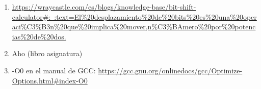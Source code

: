 \documentclass[11pt,a4paper,twoside]{article}
\theoremstyle{definition}
\begin{document}
	\begin{enumerate}
		\item \href{https://wraycastle.com/es/blogs/knowledge-base/bit-shift-calculator#:~:text=El%20desplazamiento%20de%20bits%20es%20una%20operaci%C3%B3n%20que%20implica%20mover,n%C3%BAmero%20por%20potencias%20de%20dos.}{https://wraycastle.com/es/blogs/knowledge-base/bit-shift-calculator\#:~:text=El\%20desplazamiento\%20de\%20bits\%20es\%20una\%20operaci\%C3\%B3n\%20que\%20implica\%20mover,n\%C3\%BAmero\%20por\%20potencias\%20de\%20dos.}
		
		\item Aho (libro asignatura)
		
		\item -O0 en el manual de GCC: \href{https://gcc.gnu.org/onlinedocs/gcc/Optimize-Options.html#index-O0}{https://gcc.gnu.org/onlinedocs/gcc/Optimize-Options.html\#index-O0}
	\end{enumerate}
	
	
	
\end{document}
